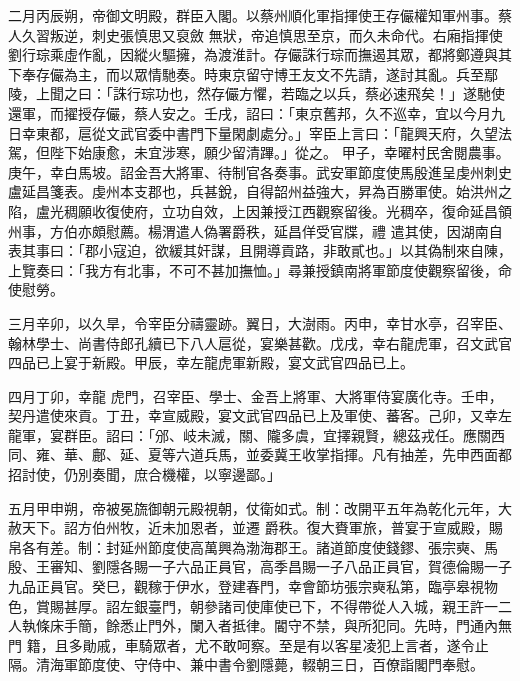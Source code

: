 \begin{pinyinscope}
二月丙辰朔，帝御文明殿，群臣入閣。以蔡州順化軍指揮使王存儼權知軍州事。蔡人久習叛逆，刺史張慎思又裒斂
 無狀，帝追慎思至京，而久未命代。右廂指揮使劉行琮乘虛作亂，因縱火驅擁，為渡淮計。存儼誅行琮而撫遏其眾，都將鄭遵與其下奉存儼為主，而以眾情馳奏。時東京留守博王友文不先請，遂討其亂。兵至鄢陵，上聞之曰：「誅行琮功也，然存儼方懼，若臨之以兵，蔡必速飛矣！」遂馳使還軍，而擢授存儼，蔡人安之。壬戌，詔曰：「東京舊邦，久不巡幸，宜以今月九日幸東都，扈從文武官委中書門下量閑劇處分。」宰臣上言曰：「龍興天府，久望法
 駕，但陛下始康愈，未宜涉寒，願少留清蹕。」從之。
 甲子，幸曜村民舍閱農事。庚午，幸白馬坡。詔金吾大將軍、待制官各奏事。武安軍節度使馬殷進呈虔州刺史盧延昌箋表。虔州本支郡也，兵甚銳，自得韶州益強大，昇為百勝軍使。始洪州之陷，盧光稠願收復使府，立功自效，上因兼授江西觀察留後。光稠卒，復命延昌領州事，方伯亦頗慰薦。楊渭遣人偽署爵秩，延昌佯受官牒，禮
 遣其使，因湖南自表其事曰：「郡小寇迫，欲緩其奸謀，且開導貢路，非敢貳也。」以其偽制來自陳，上覽奏曰：「我方有北事，不可不甚加撫恤。」尋兼授鎮南將軍節度使觀察留後，命使慰勞。



 三月辛卯，以久旱，令宰臣分禱靈跡。翼日，大澍雨。丙申，幸甘水亭，召宰臣、翰林學士、尚書侍郎孔續已下八人扈從，宴樂甚歡。戊戌，幸右龍虎軍，召文武官四品已上宴于新殿。甲辰，幸左龍虎軍新殿，宴文武官四品已上。



 四月丁卯，幸龍
 虎門，召宰臣、學士、金吾上將軍、大將軍侍宴廣化寺。壬申，契丹遣使來貢。丁丑，幸宣威殿，宴文武官四品已上及軍使、蕃客。己卯，又幸左龍軍，宴群臣。詔曰：「邠、岐未滅，關、隴多虞，宜擇親賢，總茲戎任。應關西同、雍、華、鄜、延、夏等六道兵馬，並委冀王收掌指揮。凡有抽差，先申西面都招討使，仍別奏聞，庶合機權，以寧邊鄙。」



 五月甲申朔，帝被冕旒御朝元殿視朝，仗衛如式。制：改開平五年為乾化元年，大赦天下。詔方伯州牧，近未加恩者，並遷
 爵秩。復大賚軍旅，普宴于宣威殿，賜帛各有差。制：封延州節度使高萬興為渤海郡王。諸道節度使錢鏐、張宗奭、馬殷、王審知、劉隱各賜一子六品正員官，高季昌賜一子八品正員官，賀德倫賜一子九品正員官。癸巳，觀稼于伊水，登建春門，幸會節坊張宗奭私第，臨亭皋視物色，賞賜甚厚。詔左銀臺門，朝參諸司使庫使已下，不得帶從人入城，親王許一二人執條床手簡，餘悉止門外，闌入者抵律。閽守不禁，與所犯同。先時，門通內無門
 籍，且多勛戚，車騎眾者，尤不敢呵察。至是有以客星凌犯上言者，遂令止隔。清海軍節度使、守侍中、兼中書令劉隱薨，輟朝三日，百僚詣閣門奉慰。




\end{pinyinscope}
